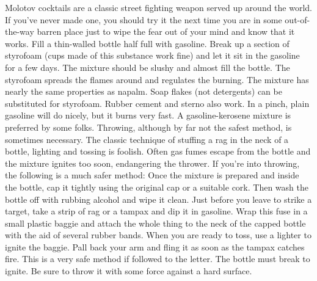 \documentclass[11pt,twoside,a4paper]{book}
\begin{document}
	Molotov cocktails are a classic street fighting weapon served up around the world. If you've never made one, you should try it the next time you are in some out-of-the-way barren place just to wipe the fear out of your mind and know that it works. Fill a thin-walled bottle half full with gasoline. Break up a section of styrofoam (cups made of this substance work fine) and let it sit in the gasoline for a few days. The mixture should be slushy and almost fill the bottle. The styrofoam spreads the flames around and regulates the burning. The mixture has nearly the same properties as napalm. Soap flakes (not detergents) can be substituted for styrofoam. Rubber cement and sterno also work. In a pinch, plain gasoline will do nicely, but it burns very fast. A gasoline-kerosene mixture is preferred by some folks. Throwing, although by far not the safest method, is sometimes necessary. The classic technique of stuffing a rag in the neck of a bottle, lighting and tossing is foolish. Often gas fumes escape from the bottle and the mixture ignites too soon, endangering the thrower. If you're into throwing, the following is a much safer method: Once the mixture is prepared and inside the bottle, cap it tightly using the original cap or a suitable cork. Then wash the bottle off with rubbing alcohol and wipe it clean. Just before you leave to strike a target, take a strip of rag or a tampax and dip it in gasoline. Wrap this fuse in a small plastic baggie and attach the whole thing to the neck of the capped bottle with the aid of several rubber bands. When you are ready to toss, use a lighter to ignite the baggie. Pall back your arm and fling it as soon as the tampax catches fire. This is a very safe method if followed to the letter. The bottle must break to ignite. Be sure to throw it with some force against a hard surface.~\\
\end{document}
